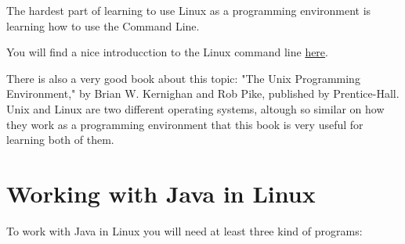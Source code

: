 \documentclass[a4paper, 12pt]{article}
\begin{document}
The hardest part of learning to use Linux as a programming environment is
learning how to use the Command Line.

You will find a nice introducction to the Linux command line
\href{http://linuxcommand.org/lc3_learning_the_shell.php#contents}{here}.

There is also a very good book about this topic: "The Unix Programming
Environment," by Brian W. Kernighan and Rob Pike, published by Prentice-Hall.
Unix and Linux are two different operating systems, altough so similar on how
they work as a programming environment that this book is very useful for
learning both of them.


\section{Working with Java in Linux}

To work with Java in Linux you will need at least three kind of programs:
\end{document}
